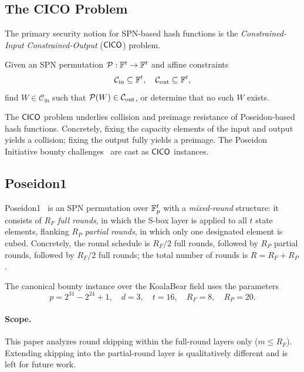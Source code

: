 \documentclass[11pt]{article}
\begin{document}
\subsection{The CICO Problem}

The primary security notion for SPN-based hash functions is the \emph{Constrained-Input Constrained-Output} ($\CICO$) problem.

\begin{definition}[$\CICO$]
    Given an SPN permutation $\mathcal{P} : \mathbb{F}^t \to \mathbb{F}^t$ and affine constraints
    \[
        \mathcal{C}_{\mathrm{in}} \subseteq \mathbb{F}^t, \quad \mathcal{C}_{\mathrm{out}} \subseteq \mathbb{F}^t,
    \]
    find $W \in \mathcal{C}_{\mathrm{in}}$ such that $\mathcal{P}(W) \in \mathcal{C}_{\mathrm{out}}$, or determine that no such $W$ exists.
\end{definition}

The $\CICO$ problem underlies collision and preimage resistance of Poseidon-based hash functions. Concretely, fixing the capacity elements of the input and output yields a collision; fixing the output fully yields a preimage. The Poseidon Initiative bounty challenges~\cite{poseidoninitiative} are cast as $\CICO$ instances.

\subsection{Poseidon1}
\label{sec:poseidon1}

Poseidon1~\cite{poseidon} is an SPN permutation over $\mathbb{F}_p^t$ with a \emph{mixed-round} structure: it consists of $R_F$ \emph{full rounds}, in which the S-box layer is applied to all $t$ state elements, flanking $R_P$ \emph{partial rounds}, in which only one designated element is cubed. Concretely, the round schedule is $R_F/2$ full rounds, followed by $R_P$ partial rounds, followed by $R_F/2$ full rounds; the total number of rounds is $R = R_F + R_P$.

The canonical bounty instance over the KoalaBear field uses the parameters
\[
    p = 2^{31} - 2^{24} + 1, \quad d = 3, \quad t = 16, \quad R_F = 8, \quad R_P = 20.
\]

\paragraph{Scope.}
This paper analyzes round skipping within the full-round layers only ($m \leq R_F$). Extending skipping into the partial-round layer is qualitatively different and is left for future work.
\end{document}
